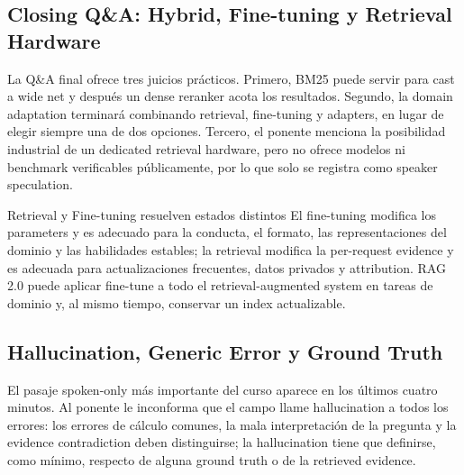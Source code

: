 \documentclass[a4paper]{article}
\begin{document}

\subsection{Closing Q\&A: Hybrid, Fine-tuning y Retrieval Hardware}

La Q\&A final ofrece tres juicios prácticos. Primero, BM25 puede servir para cast a wide net y después un dense reranker acota los resultados. Segundo, la domain adaptation terminará combinando retrieval, fine-tuning y adapters, en lugar de elegir siempre una de dos opciones. Tercero, el ponente menciona la posibilidad industrial de un dedicated retrieval hardware, pero no ofrece modelos ni benchmark verificables públicamente, por lo que solo se registra como speaker speculation.

\begin{knowledgebox}{Retrieval y Fine-tuning resuelven estados distintos}
El fine-tuning modifica los parameters y es adecuado para la conducta, el formato, las representaciones del dominio y las habilidades estables; la retrieval modifica la per-request evidence y es adecuada para actualizaciones frecuentes, datos privados y attribution. RAG 2.0 puede aplicar fine-tune a todo el retrieval-augmented system en tareas de dominio y, al mismo tiempo, conservar un index actualizable.
\end{knowledgebox}


\subsection{Hallucination, Generic Error y Ground Truth}

El pasaje spoken-only más importante del curso aparece en los últimos cuatro minutos. Al ponente le inconforma que el campo llame hallucination a todos los errores: los errores de cálculo comunes, la mala interpretación de la pregunta y la evidence contradiction deben distinguirse; la hallucination tiene que definirse, como mínimo, respecto de alguna ground truth o de la retrieved evidence.
\end{document}
